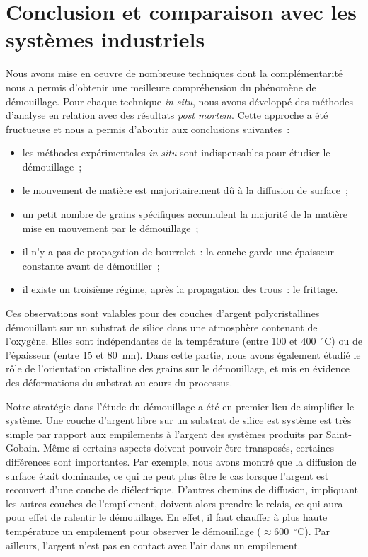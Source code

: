 \section[Conclusion]{Conclusion et comparaison avec les systèmes industriels}
Nous avons mise en oeuvre de nombreuse techniques dont la complémentarité nous a permis d'obtenir une meilleure compréhension du phénomène de démouillage. Pour chaque technique \textit{in situ}, nous avons développé des méthodes d'analyse en relation avec des résultats \textit{post mortem}. Cette approche a été fructueuse et nous a permis d'aboutir aux conclusions suivantes~:
\begin{itemize}
\item les méthodes expérimentales \textit{in situ} sont indispensables pour étudier le démouillage~;
\item le mouvement de matière est majoritairement dû à la diffusion de surface~;
\item un petit nombre de grains spécifiques accumulent la majorité de la matière mise en mouvement par le démouillage~;
\item il n'y a pas de propagation de bourrelet~: la couche garde une épaisseur constante avant de démouiller~;
\item il existe un troisième régime, après la propagation des trous~: le frittage.
\end{itemize}
Ces observations sont valables pour des couches d'argent polycristallines démouillant sur un substrat de silice dans une atmosphère contenant de l'oxygène. Elles sont indépendantes de la température (entre 100 et 400~$^\circ$C) ou de l'épaisseur (entre 15 et 80~nm). Dans cette partie, nous avons également étudié le rôle de l'orientation cristalline des grains sur le démouillage, et mis en évidence des déformations du substrat au cours du processus.\par

Notre stratégie dans l'étude du démouillage a été en premier lieu de simplifier le système. Une couche d'argent libre sur un substrat de silice est système est très simple par rapport aux empilements à l'argent des systèmes produits par Saint-Gobain. Même si certains aspects doivent pouvoir être transposés, certaines différences sont importantes. Par exemple, nous avons montré que la diffusion de surface était dominante, ce qui ne peut plus être le cas lorsque l'argent est recouvert d'une couche de diélectrique. D'autres chemins de diffusion, impliquant les autres couches de l'empilement, doivent alors prendre le relais, ce qui aura pour effet de ralentir le démouillage. En effet, il faut chauffer à plus haute température un empilement pour observer le démouillage ($\approx$600~$^\circ$C). Par ailleurs, l'argent n'est pas en contact avec l'air dans un empilement.\par

